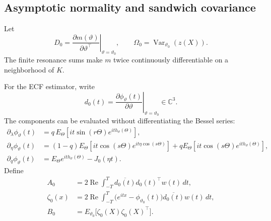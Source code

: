 \documentclass[11pt]{amsart}
\numberwithin{equation}{section}\setcounter{tocdepth}{3}\setcounter{secnumdepth}{3}
\begin{document}
\subsection{Asymptotic normality and sandwich covariance}\label{subsec:asymptotic_normality}
Let
\begin{equation}
 D_0=\left.\frac{\partial m(\vartheta)}{\partial\vartheta^\top}
       \right|_{\vartheta=\vartheta_0},
 \qquad
 \Omega_0=\operatorname{Var}_{\vartheta_0}(z(X)).
 \label{eq:moment_derivative_covariance}
\end{equation}
The finite resonance sums make $m$ twice continuously differentiable on a neighborhood
of $K$.

For the ECF estimator, write
\begin{equation}
 d_0(t)=\left.\frac{\partial\phi_\vartheta(t)}{\partial\vartheta}
       \right|_{\vartheta=\vartheta_0}\in\mathbb C^3.
 \label{eq:ecf_derivative_vector}
\end{equation}
The components can be evaluated without differentiating the Bessel series:
\begin{align}
 \partial_\lambda\phi_\vartheta(t)
 &=q\,E_\Theta\!\left[it\sin(r\Theta)e^{it h_\vartheta(\Theta)}\right],
 \label{eq:ecf_derivative_lambda}\\
 \partial_\eta\phi_\vartheta(t)
 &=(1-q)E_\Theta\!\left[it\cos(s\Theta)e^{it\eta\cos(s\Theta)}\right]
 +qE_\Theta\!\left[it\cos(s\Theta)e^{it h_\vartheta(\Theta)}\right],
 \label{eq:ecf_derivative_eta}\\
 \partial_q\phi_\vartheta(t)
 &=E_\Theta e^{it h_\vartheta(\Theta)}-J_0(\eta t).
 \label{eq:ecf_derivative_q}
\end{align}
Define
\begin{align}
 A_0&=2\operatorname{Re}\int_{-T}^T
       \overline{d_0(t)}d_0(t)^\top w(t)\,dt,
 \label{eq:ecf_bread}\\
 \zeta_0(x)&=2\operatorname{Re}\int_{-T}^T
 \bigl(e^{itx}-\phi_{\vartheta_0}(t)\bigr)
 \overline{d_0(t)}w(t)\,dt,
 \label{eq:ecf_influence_score}\\
 B_0&=E_{\vartheta_0}\bigl[\zeta_0(X)\zeta_0(X)^\top\bigr].
 \label{eq:ecf_meat}
\end{align}
\end{document}
